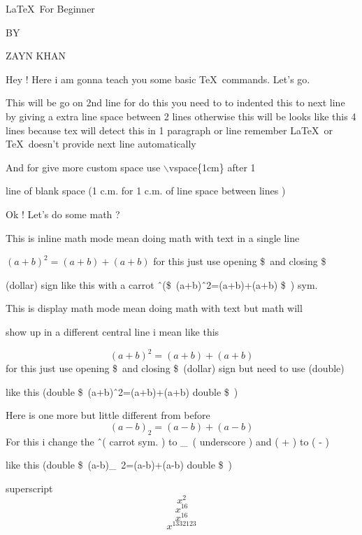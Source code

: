 \documentclass[11pt]{article}
\begin{document}
\begin{center}
\Large \LaTeX\ For Beginner

\small BY

\Large ZAYN KHAN
\end{center}

 Hey ! Here i am gonna teach you some basic \TeX\ commands. Let's go.
 

 This will be go on 2nd line for do this you need to to indented this to next line by giving a extra line space between 2 lines otherwise this will be looks like this 4 lines because tex will detect this in 1 paragraph or line remember \LaTeX\ or \TeX\ doesn't provide next line automatically
 
  \vspace{1cm}
  
 And for give more custom space use $\backslash$vspace\{1cm\} after 1
 
 line of blank space (1 c.m. for 1 c.m. of line space between lines )
 
 \vspace{1cm}
 Ok ! Let's do some math ?
 
This is inline math mode mean doing math with text in a single line 

${(a+b)^2=(a+b)+(a+b)}$ for this just use opening \$\ and closing \$\

(dollar) sign like this with a carrot \^\ (\$\ (a+b)\^\ 2=(a+b)+(a+b) \$\ ) sym.
 
 \vspace{1cm}
 
 This is display math mode mean doing math with text but math will 
 
 show up in a different central line i mean like this

$${(a+b)^2=(a+b)+(a+b)}$$ for this just use opening \$\ and closing \$\ (dollar) sign but need to use (double)

like this (double \$\ (a+b)\^\ 2=(a+b)+(a+b) double \$\ )

\vspace{1cm}

Here is one more but little different from before
 $$(a-b)_2=(a-b)+(a-b)$$
For this i change the \^\ ( carrot sym. ) to \_\ ( underscore ) and ( + ) to ( - )


like this (double \$\ (a-b)\_\ 2=(a-b)+(a-b) double \$\ )


 \pagebreak
 
 
 superscript
 $$x^2$$ $$x^16$$
 $$x^{16}$$
 $$x^{1332123}$$
 
\end{document}
